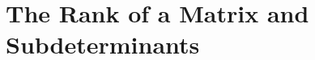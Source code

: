 \section{The Rank of a Matrix and Subdeterminants} 
\bx{
\en{
    \item 
    \item 
    \item 
    \item 
    \item 
    \item 
    \item 
    \item 
    \item 
}
}